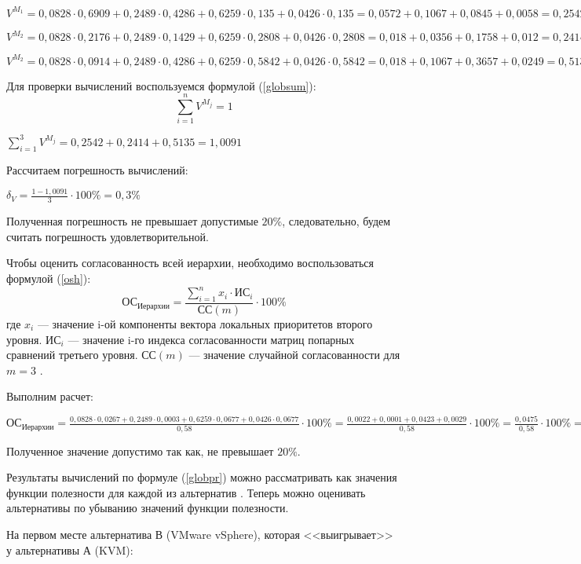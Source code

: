 $V^{M_1} = 0,0828 \cdot 0,6909 + 0,2489 \cdot 0,4286 + 0,6259 \cdot 0,135 + 0,0426 \cdot 0,135 = 0,0572 + 0,1067 + 0,0845 + 0,0058 = 0,2542$

$V^{M_2} = 0,0828 \cdot 0,2176 + 0,2489 \cdot 0,1429 + 0,6259 \cdot 0,2808 + 0,0426 \cdot 0,2808 = 0,018 + 0,0356 + 0,1758 + 0,012 = 0,2414$

$V^{M_2} = 0,0828 \cdot 0,0914 + 0,2489 \cdot 0,4286 + 0,6259 \cdot 0,5842 + 0,0426 \cdot 0,5842 = 0,018 + 0,1067 + 0,3657 + 0,0249 = 0,5135$

Для проверки вычислений воспользуемся формулой (\ref{globsum}):
\begin{equation}\label{globsum}
\sum_{i = 1}^{n} V^{M_j} = 1
\end{equation}

$\sum_{i = 1}^{3} V^{M_j} = 0,2542 + 0,2414 + 0,5135 = 1,0091$

Рассчитаем погрешность вычислений:

$\delta_{V} = \frac{1 - 1,0091}{3} \cdot 100\% = 0,3\%$

Полученная погрешность не превышает допустимые $20\%$, следовательно, будем считать погрешность удовлетворительной.

Чтобы оценить согласованность всей иерархии, необходимо воспользоваться формулой (\ref{osh}):
\begin{equation}\label{osh}
\text{ОС}_{\text{Иерархии}} = \frac{\sum_{i = 1}^{n} x_i \cdot \text{ИС}_i}{\text{СС}(m)} \cdot 100\%
\end{equation}
где $x_i$ --- значение i-ой компоненты вектора локальных приоритетов второго уровня.
$\text{ИС}_i$ --- значение i-го индекса согласованности матриц попарных сравнений третьего уровня.
$\text{СС}(m)$ --- значение случайной согласованности для $m = 3$ \cite{var-analyz}.

Выполним расчет:

$\text{ОС}_{\text{Иерархии}} = \frac{0,0828 \cdot 0,0267 + 0,2489 \cdot 0,0003 + 0,6259 \cdot 0,0677 + 0,0426 \cdot 0,0677}{0,58} \cdot 100\% = \frac{0,0022 + 0,0001 + 0,0423 + 0,0029}{0,58} \cdot 100\% = \frac{0,0475}{0,58} \cdot 100\% = 8,19\%$

Полученное значение допустимо так как, не превышает $20\%$.

Результаты вычислений по формуле (\ref{globpr}) можно рассматривать как значения функции полезности для каждой из альтернатив \cite{var-analyz}.
Теперь можно оценивать альтернативы по убыванию значений функции полезности.

На первом месте альтернатива В (VMware vSphere), которая <<выигрывает>> у альтернативы А (KVM):

